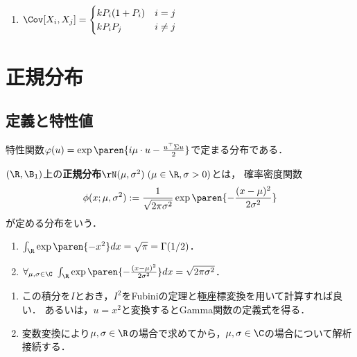 \documentclass[uplatex,dvipdfmx]{jsreport}
\begin{document}
\begin{proposition}[確率母関数の微分からわかること]\mbox{}
    \begin{enumerate}
        \item $\Cov[X_i,X_j]=\begin{cases}
            kP_i(1+P_i)&i=j\\
            kP_iP_j&i\ne j
        \end{cases}$
    \end{enumerate}
\end{proposition}

\section{正規分布}

\subsection{定義と特性値}

\begin{tcolorbox}[colframe=ForestGreen, colback=ForestGreen!10!white,breakable,colbacktitle=ForestGreen!40!white,coltitle=black,fonttitle=\bfseries\sffamily,
    title=]
    特性関数$\varphi(u)=\exp\paren{i\mu\cdot u-\frac{u^\top\Sigma u}{2}}$で定まる分布である．
\end{tcolorbox}

\begin{definition}
    $(\R,\B_1)$上の\textbf{正規分布}$\rN(\mu,\sigma^2)\;(\mu\in\R,\sigma>0)$とは，
    確率密度関数
    \[\phi(x;\mu,\sigma^2):=\frac{1}{\sqrt{2\pi\sigma^2}}\exp\paren{-\frac{(x-\mu)^2}{2\sigma^2}}\]
    が定める分布をいう．
\end{definition}

\begin{lemma}[Gamma関数の性質]\mbox{}
    \begin{enumerate}
        \item $\int_\R\exp\paren{-x^2}dx=\sqrt{\pi}=\Gamma(1/2)$．
        \item $\forall_{\mu,\sigma\in\C}\;\int_\R\exp\paren{-\frac{(x-\mu)^2}{2\sigma^2}}dx=\sqrt{2\pi\sigma^2}$．
    \end{enumerate}
\end{lemma}
\begin{Proof}\mbox{}
    \begin{enumerate}
        \item この積分を$I$とおき，$I^2$をFubiniの定理と極座標変換を用いて計算すれば良い．
        あるいは，$u=x^2$と変換するとGamma関数の定義式を得る．
        \item 変数変換により$\mu,\sigma\in\R$の場合で求めてから，$\mu,\sigma\in\C$の場合について解析接続する．
    \end{enumerate}
\end{Proof}
\end{document}
